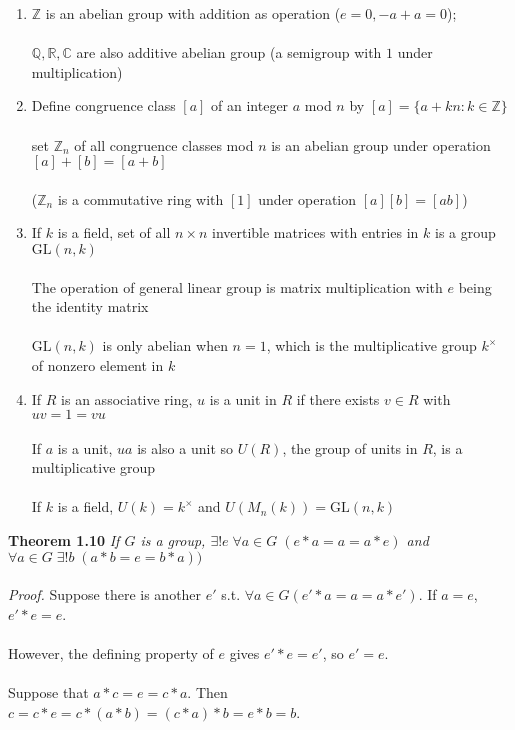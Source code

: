 \documentclass{article}
\begin{document}
\begin{enumerate}
    \item \(\mathbb{Z}\) is an abelian group with addition as operation (\(e=0,-a+a=0\));\\\\
    \(\mathbb{Q}, \mathbb{R}, \mathbb{C}\) are also additive abelian group (a semigroup with \(1\) under multiplication)
    \item Define congruence class \([a]\) of an integer \(a\) mod \(n\) by \([a]=\{a+kn: k\in\mathbb{Z}\}\)\\\\
    set \(\mathbb{Z}_n\) of all congruence classes mod \(n\) is an abelian group under operation \([a]+[b]=[a+b]\)\\\\
    (\(\mathbb{Z}_n\) is a commutative ring with \([1]\) under operation \([a][b]=[ab]\))
    \item If \(k\) is a field, set of all \(n\times n\) invertible matrices with entries in \(k\) is a group \(\mathrm{GL}(n,k)\)\\\\
    The operation of general linear group is matrix multiplication with \(e\) being the identity matrix\\\\
    \(\mathrm{GL}(n,k)\) is only abelian when \(n=1\), which is the multiplicative group \(k^\times\) of nonzero element in \(k\)
    \item If \(R\) is an associative ring, \(u\) is a unit in \(R\) if there exists \(v\in R\) with \(uv=1=vu\)\\\\
    If \(a\) is a unit, \(ua\) is also a unit so \(U(R)\), the group of units in \(R\), is a multiplicative group\\\\
    If \(k\) is a field, \(U(k)=k^\times\) and \(U(M_n(k))=\mathrm{GL}(n,k)\)
\end{enumerate}
\begin{redrules}\color{red}
\textbf{Theorem 1.10} \textit{If \(G\) is a group, \(\exists !e\;\forall a\in G\;(e*a=a=a*e)\) and \(\forall a\in G\;\exists !b\;(a*b=e=b*a))\)}\\\\\color{black}
\textit{Proof.} Suppose there is another \(e'\) s.t. \(\forall a\in G (e'*a=a=a*e')\). If \(a=e\), \(e'*e=e\).\\\\
\null\qquad However, the defining property of \(e\) gives \(e'*e=e'\), so \(e'=e\).\\\\
Suppose that \(a*c=e=c*a\). Then \(c=c*e=c*(a*b)=(c*a)*b=e*b=b\).
\end{redrules}
\end{document}

